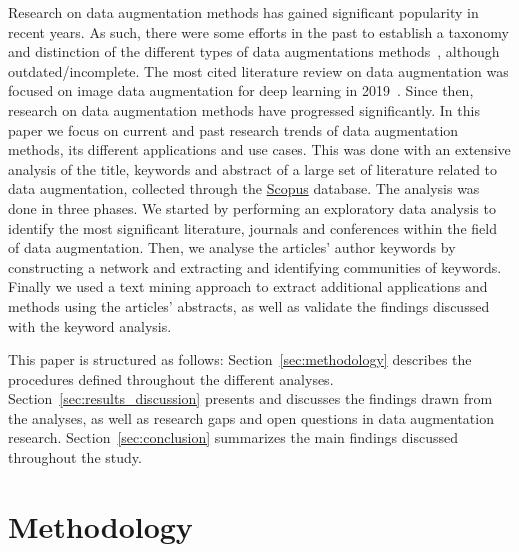 \documentclass[parskip=full]{scrartcl}
\begin{document}
Research on data augmentation methods has gained significant popularity in
recent years. As such, there were some efforts in the past to establish a
taxonomy and distinction of the different types of data augmentations
methods~\cite{Shorten2019}, although outdated/incomplete. The most cited
literature review on data augmentation was focused on image data augmentation
for deep learning in 2019~\cite{Shorten2019}. Since then, research on data
augmentation methods have progressed significantly. In this paper we focus on
current and past research trends of data augmentation methods, its different
applications and use cases. This was done with an extensive analysis of the
title, keywords and abstract of a large set of literature related to data
augmentation, collected through the \href{https://www.scopus.com/}{Scopus}
database. The analysis was done in three phases. We started by performing an
exploratory data analysis to identify the most significant literature,
journals and conferences within the field of data augmentation. Then, we
analyse the articles' author keywords by constructing a network and extracting
and identifying communities of keywords. Finally we used a text mining
approach to extract additional applications and methods using the articles'
abstracts, as well as validate the findings discussed with the keyword
analysis.

This paper is structured as follows: Section~\ref{sec:methodology} describes
the procedures defined throughout the different analyses.
Section~\ref{sec:results_discussion} presents and discusses the findings drawn
from the analyses, as well as research gaps and open questions in data
augmentation research. Section~\ref{sec:conclusion} summarizes the main
findings discussed throughout the study.


% 
%
% 
% 
% 
% 

\section{Methodology}~\label{sec:methodology}
\end{document}
